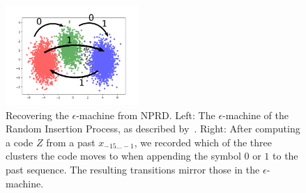 \documentclass[entropy,article,submit,moreauthors,pdftex,10pt,a4paper]{Definitions/mdpi}
\begin{document}
\begin{figure}
\includegraphics[width=0.45\textwidth]{code/figures/foo_pca_3_machine.png}


	\caption{Recovering the $\epsilon$-machine from NPRD. Left: The $\epsilon$-machine of the Random Insertion Process, as described by~\cite{marzen-predictive-2016}. Right: After computing a code $Z$ from a past $x_{-15\dots-1}$, we recorded which of the three clusters the code moves to when appending the symbol $0$ or $1$ to the past sequence. The resulting transitions mirror those in the $\epsilon$-machine. }\label{fig:rip-machine}
\end{figure}






\end{document}
